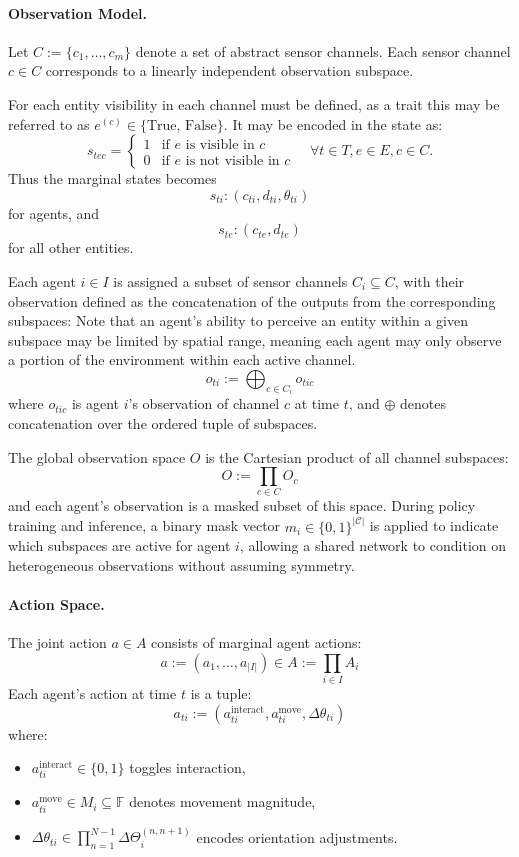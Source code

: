 \paragraph{Observation Model.}
Let \({C} := \{c_1, \ldots, c_m\}\) denote a set of abstract sensor channels.
Each sensor channel \(c \in {C}\) corresponds to a linearly 
independent observation subspace.

For each entity visibility in each channel must be defined,
as a trait this may be referred to as \(e^{(c)} \in \{\text{True, False}\}\).
It may be encoded in the state as:
\[
s_{tec} = 
\begin{cases}
    1& \text{if \(e\) is visible in \(c\)} \\ 
    0& \text{if \(e\) is not visible in \(c\)}
\end{cases} 
\quad\forall t\in T, e\in E, c\in C.
\]
Thus the marginal states becomes
\[s_{ti} :(c_{ti},d_{ti},\theta_{ti})\]
for agents, and
\[s_{te} :(c_{te},d_{te})\]
for all other entities.

Each agent \(i \in I\) is assigned a subset of sensor channels 
\({C}_i \subseteq {C}\), 
with their observation defined as the concatenation of the outputs 
from the corresponding subspaces:
Note that an agent's ability to perceive an entity within a given 
subspace may be limited by spatial range, meaning each agent may 
only observe a portion of the environment within each active channel.
\[
    o_{ti} := \bigoplus_{c \in {C}_i} o_{tic}
\]
where \(o_{tic}\) is agent \(i\)'s observation of channel \(c\) at time \(t\), 
and \(\oplus\) denotes concatenation over the ordered tuple of subspaces.

The global observation space \(O\) is the Cartesian product of all channel subspaces:
\[
    O := \prod_{c \in {C}} O_c
\]
and each agent's observation is a masked subset of this space.
During policy training and inference, a binary mask vector \(m_i \in \{0,1\}^{|\mathcal{C}|}\) 
is applied to indicate which subspaces are active for agent \(i\), 
allowing a shared network to condition on heterogeneous observations without assuming symmetry.


\paragraph{Action Space.} 
The joint action \(a \in A\) consists of marginal agent actions:
\[
    a := (a_1, \ldots, a_{|I|}) \in A := \prod_{i \in I} A_i
\]
Each agent's action at time \(t\) is a tuple:
\[
    a_{ti} := (a_{ti}^\text{interact}, a_{ti}^\text{move}, \Delta\theta_{ti})
\]
where:
\begin{itemize}
    \item \(a_{ti}^\text{interact} \in \{0,1\}\) toggles interaction,
    \item \(a_{ti}^\text{move} \in M_i \subseteq \mathbb{F}\) denotes movement magnitude,
    \item \(\Delta\theta_{ti} \in \prod_{n=1}^{N-1} \Delta\Theta_i^{(n,n+1)}\) encodes orientation adjustments.
\end{itemize}

